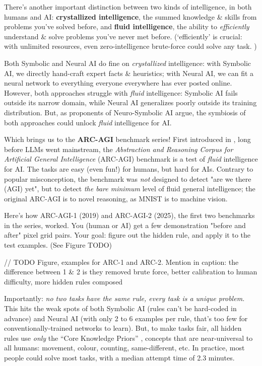 \documentclass{article}
\begin{document}
There's another important distinction between two kinds of intelligence, in both humans \citep{cattell} and AI: \textbf{crystallized intelligence}, the summed knowledge \& skills from problems you've solved before, and \textbf{fluid intelligence}, the ability to \textit{efficiently} understand \& solve problems you've never met before. (`efficiently' is crucial: with unlimited resources, even zero-intelligence brute-force could solve any task. \citep{chollet_intelligence})

Both Symbolic and Neural AI do fine on \textit{crystallized} intelligence: with Symbolic AI, we directly hand-craft expert facts \& heuristics; with Neural AI, we can fit a neural network to everything everyone everywhere has ever posted online. However, both approaches struggle with \textit{fluid} intelligence: Symbolic AI fails outside its narrow domain, while Neural AI generalizes poorly outside its training distribution. But, as proponents of Neuro-Symbolic AI argue, the symbiosis of both approaches could unlock \textit{fluid} intelligence for AI.

Which brings us to the \textbf{ARC-AGI} benchmark series! First introduced in \citet{chollet_intelligence}, long before LLMs went mainstream, the \textit{Abstraction and Reasoning Corpus for Artificial General Intelligence} (ARC-AGI) benchmark is a test of \textit{fluid} intelligence for AI. The tasks are easy (even fun!) for humans, but hard for AIs. Contrary to popular misconception, the benchmark was \textit{not} designed to detect "are we there (AGI) yet", but to detect \textit{the bare minimum} level of fluid general intelligence; the original ARC-AGI is to novel reasoning, as MNIST is to machine vision.

Here's how ARC-AGI-1 (2019) and ARC-AGI-2 (2025), the first two benchmarks in the series, worked. You (human or AI) get a few demonstration "before and after" pixel grid pairs. Your goal: figure out the hidden rule, and apply it to the test examples. (See Figure TODO) 

// TODO Figure, examples for ARC-1 and ARC-2. Mention in caption: the difference between 1 \& 2 is they removed brute force, better calibration to human difficulty, more hidden rules composed

Importantly: \textit{no two tasks have the same rule, every task is a unique problem.} This hits the weak spots of both Symbolic AI (rules can't be hard-coded in advance) and Neural AI (with only 2 to 6 examples per rule, that's too few for conventionally-trained networks to learn). But, to make tasks fair, all hidden rules use \textit{only} the ``Core Knowledge Priors'' \citep{core_knowledge_priors}, concepts that are near-universal to all humans: movement, colour, counting, same-different, etc. In practice, most people could solve most tasks, with a median attempt time of 2.3 minutes. \citep{arc_agi_2}
\end{document}

